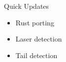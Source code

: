 
\begin{frame}{Quick Updates}
    \begin{itemize}
        \item Rust porting
        \item Laser detection
        \item Tail detection
    \end{itemize}    
\end{frame}